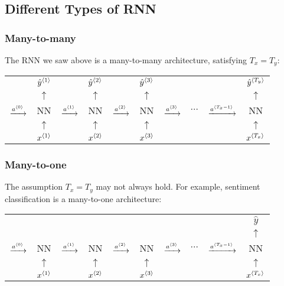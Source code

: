 \subsection{Different Types of RNN}
\subsubsection{Many-to-many}
The RNN we saw above is a many-to-many architecture, satisfying $T_x=T_y$:
\begin{center}
  \begin{tabular}{cccccccccc}
    & $\hat{y}^{\left\langle 1\right\rangle}$ & & $\hat{y}^{\left\langle 2\right\rangle}$ & & $\hat{y}^{\left\langle 3\right\rangle}$ & & & & $\hat{y}^{\left\langle T_y\right\rangle}$\\
    & $\uparrow$ & & $\uparrow$ & & $\uparrow$ & & & & $\uparrow$\\ 
    $\xrightarrow{a^{\left\langle 0\right\rangle}}$& NN & $\xrightarrow{a^{\left\langle 1\right\rangle}}$ & NN & $\xrightarrow{a^{\left\langle 2\right\rangle}}$ & NN & $\xrightarrow{a^{\left\langle 3\right\rangle}}$ & $\cdots$ & $\xrightarrow{a^{\left\langle T_x-1\right\rangle}}$ & NN \\ 
    & $\uparrow$ & & $\uparrow$ & & $\uparrow$ & & & & $\uparrow$\\ 
    & $x^{\left\langle 1\right\rangle}$ & & $x^{\left\langle 2\right\rangle}$ & & $x^{\left\langle 3\right\rangle}$ & & & & $x^{\left\langle T_x\right\rangle}$\\
  \end{tabular}
\end{center}
\subsubsection{Many-to-one}
The assumption $T_x=T_y$ may not always hold. For example, sentiment classification is a many-to-one architecture:
\begin{center}
  \begin{tabular}{cccccccccc}
    & & & & & & & & & $\hat{y}$\\
    & & & & & & & & & $\uparrow$\\ 
    $\xrightarrow{a^{\left\langle 0\right\rangle}}$& NN & $\xrightarrow{a^{\left\langle 1\right\rangle}}$ & NN & $\xrightarrow{a^{\left\langle 2\right\rangle}}$ & NN & $\xrightarrow{a^{\left\langle 3\right\rangle}}$ & $\cdots$ & $\xrightarrow{a^{\left\langle T_x-1\right\rangle}}$ & NN \\ 
    & $\uparrow$ & & $\uparrow$ & & $\uparrow$ & & & & $\uparrow$\\ 
    & $x^{\left\langle 1\right\rangle}$ & & $x^{\left\langle 2\right\rangle}$ & & $x^{\left\langle 3\right\rangle}$ & & & & $x^{\left\langle T_x\right\rangle}$\\
  \end{tabular}
\end{center}
